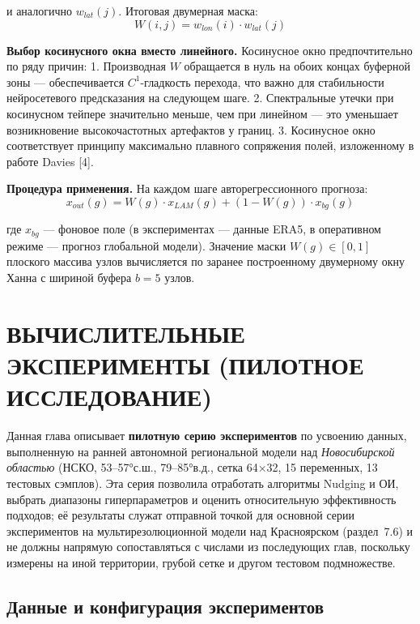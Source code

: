\documentclass[14pt,a4paper]{extarticle}
\numberwithin{table}{section}
\numberwithin{figure}{section}
\numberwithin{equation}{section}
\begin{document}
и аналогично \(w_{lat}(j)\). Итоговая двумерная маска:
\[W(i, j) = w_{lon}(i) \cdot w_{lat}(j)\]

\textbf{Выбор косинусного окна вместо линейного.} Косинусное окно
предпочтительно по ряду причин: 1. Производная \(W\) обращается в нуль
на обоих концах буферной зоны --- обеспечивается \(C^1\)-гладкость
перехода, что важно для стабильности нейросетевого предсказания на
следующем шаге. 2. Спектральные утечки при косинусном тейпере
значительно меньше, чем при линейном --- это уменьшает возникновение
высокочастотных артефактов у границ. 3. Косинусное окно соответствует
принципу максимально плавного сопряжения полей, изложенному в работе
Davies {[}4{]}.

\textbf{Процедура применения.} На каждом шаге авторегрессионного
прогноза:
\[x_{out}(g) = W(g) \cdot x_{LAM}(g) + (1 - W(g)) \cdot x_{bg}(g)\]

где \(x_{bg}\) --- фоновое поле (в экспериментах --- данные ERA5, в
оперативном режиме --- прогноз глобальной модели). Значение маски
\(W(g) \in [0, 1]\) плоского массива узлов вычисляется по заранее
построенному двумерному окну Ханна с шириной буфера \(b = 5\) узлов.


\newpage

\section{ВЫЧИСЛИТЕЛЬНЫЕ ЭКСПЕРИМЕНТЫ (ПИЛОТНОЕ
ИССЛЕДОВАНИЕ)}\label{ux432ux44bux447ux438ux441ux43bux438ux442ux435ux43bux44cux43dux44bux435-ux44dux43aux441ux43fux435ux440ux438ux43cux435ux43dux442ux44b}

Данная глава описывает \textbf{пилотную серию экспериментов} по
усвоению данных, выполненную на ранней автономной региональной модели
над \emph{Новосибирской областью} (НСКО, 53--57°с.ш., 79--85°в.д.,
сетка 64×32, 15 переменных, 13 тестовых сэмплов). Эта серия позволила
отработать алгоритмы Nudging и ОИ, выбрать диапазоны
гиперпараметров и оценить относительную эффективность подходов; её
результаты служат отправной точкой для основной серии экспериментов на
мультирезолюционной модели над Красноярском (раздел~7.6) и не должны
напрямую сопоставляться с числами из последующих глав, поскольку
измерены на иной территории, грубой сетке и другом тестовом подмножестве.

\subsection{Данные и конфигурация экспериментов}\label{ux434ux430ux43dux43dux44bux435-ux438-ux43aux43eux43dux444ux438ux433ux443ux440ux430ux446ux438ux44f-ux44dux43aux441ux43fux435ux440ux438ux43cux435ux43dux442ux43eux432}
\end{document}

